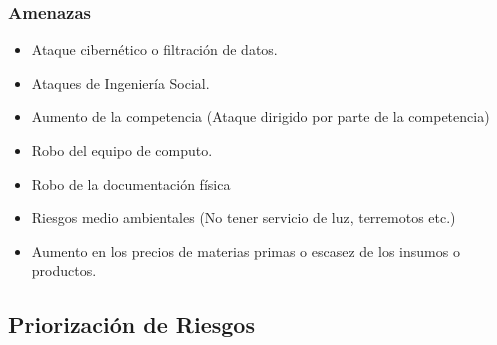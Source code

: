 \subsubsection{Amenazas}
\begin{itemize}
\item Ataque cibernético o filtración de datos.
\item Ataques de Ingeniería Social.
\item Aumento de la competencia (Ataque dirigido por parte de la competencia)
\item Robo del equipo de computo.
\item Robo de la documentación física
\item Riesgos medio ambientales (No tener servicio de luz, terremotos etc.)
\item Aumento en los precios de materias primas o escasez de los insumos o productos.
\end{itemize}

\subsection{Priorización de Riesgos} 